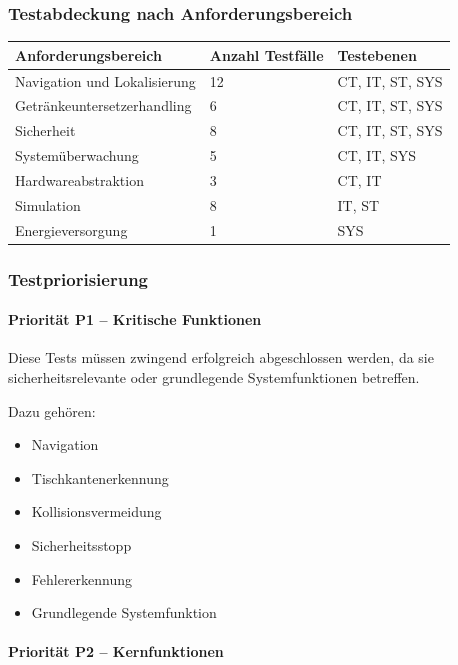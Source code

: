 \subsubsection{Testabdeckung nach
Anforderungsbereich}\label{testabdeckung-nach-anforderungsbereich}

\begin{longtable}[]{@{}lll@{}}
\toprule\noalign{}
Anforderungsbereich & Anzahl Testfälle & Testebenen \\
\midrule\noalign{}
\endhead
\bottomrule\noalign{}
\endlastfoot
Navigation und Lokalisierung & 12 & CT, IT, ST, SYS \\
Getränkeuntersetzerhandling & 6 & CT, IT, ST, SYS \\
Sicherheit & 8 & CT, IT, ST, SYS \\
Systemüberwachung & 5 & CT, IT, SYS \\
Hardwareabstraktion & 3 & CT, IT \\
Simulation & 8 & IT, ST \\
Energieversorgung & 1 & SYS \\
\end{longtable}

\subsubsection{Testpriorisierung}\label{testpriorisierung}

\paragraph{Priorität P1 -- Kritische
Funktionen}\label{priorituxe4t-p1-kritische-funktionen}

Diese Tests müssen zwingend erfolgreich abgeschlossen werden, da sie
sicherheitsrelevante oder grundlegende Systemfunktionen betreffen.

Dazu gehören:

\begin{itemize}
\tightlist
\item
  Navigation
\item
  Tischkantenerkennung
\item
  Kollisionsvermeidung
\item
  Sicherheitsstopp
\item
  Fehlererkennung
\item
  Grundlegende Systemfunktion
\end{itemize}

\paragraph{Priorität P2 --
Kernfunktionen}\label{priorituxe4t-p2-kernfunktionen-1}

